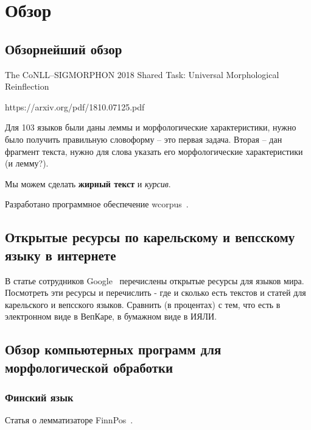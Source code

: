 \chapter{Обзор} \label{chapt1}

\section{Обзорнейший обзор} \label{sect1_1}

The CoNLL--SIGMORPHON 2018 Shared Task: Universal Morphological Reinflection

https://arxiv.org/pdf/1810.07125.pdf

Для 103 языков были даны леммы и морфологические характеристики, 
нужно было получить правильную словоформу -- это первая задача. 
Вторая -- дан фрагмент текста, нужно для слова указать его морфологические 
характеристики (и лемму?).

Мы можем сделать \textbf{жирный текст} и \textit{курсив}.

Разработано программное обеспечение wcorpus~\cite{vakbib_soft_wcorpus}.



\section{Открытые ресурсы по карельскому и вепсскому языку в интернете} \label{sect_open_krl_vep_inet}

В статье сотрудников Google~\cite{Prasad2018}  перечислены открытые ресурсы для языков мира. 
Посмотреть эти ресурсы и перечислить - где и сколько есть текстов и статей 
для карельского и вепсского языков. Сравнить (в процентах) с тем, что есть 
в электронном виде в ВепКаре, в бумажном виде в ИЯЛИ.



\section{Обзор компьютерных программ для морфологической обработки}

\subsection{Финский язык} \label{sect1_2}

Статья о лемматизаторе FinnPos~\cite{silfverberg2016finnpos}.

